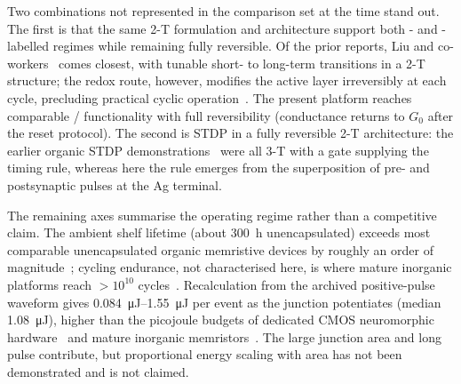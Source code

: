 Two combinations not represented in the comparison set at the time stand out. The first is that the same 2-T formulation and architecture support both \STM{}- and \LTM{}-labelled regimes while remaining fully reversible. Of the prior reports, Liu and co-workers~\cite{Liu2016} comes closest, with tunable short- to long-term transitions in a 2-T structure; the redox route, however, modifies the active layer irreversibly at each cycle, precluding practical cyclic operation~\cite{Heremans2011}. The present platform reaches comparable \STM{}/\LTM{} functionality with full reversibility (conductance returns to \(G_0\) after the reset protocol). The second is STDP in a fully reversible 2-T architecture: the earlier organic STDP demonstrations~\cite{Gkoupidenis2015, Kim2018, Seo2019} were all 3-T with a gate supplying the timing rule, whereas here the rule emerges from the superposition of pre- and postsynaptic pulses at the Ag terminal.

The remaining axes summarise the operating regime rather than a competitive claim. The ambient shelf lifetime (about \SI{300}{\hour} unencapsulated) exceeds most comparable unencapsulated organic memristive devices by roughly an order of magnitude~\cite{Shih2016}; cycling endurance, not characterised here, is where mature inorganic platforms reach \(>10^{10}\) cycles~\cite{IelminiWong2018}. Recalculation from the archived positive-pulse waveform gives \SIrange{0.084}{1.55}{\micro\joule} per event as the junction potentiates (median \SI{1.08}{\micro\joule}), higher than the picojoule budgets of dedicated CMOS neuromorphic hardware~\cite{IndiveriLiu2015,Horowitz2014} and mature inorganic memristors~\cite{YangStrukovStewart2013}. The large junction area and long pulse contribute, but proportional energy scaling with area has not been demonstrated and is not claimed.

